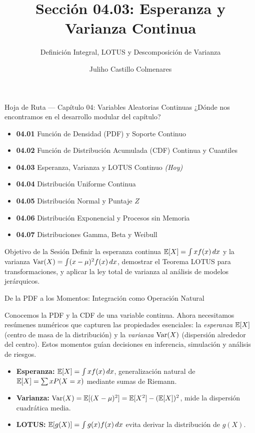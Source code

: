 \documentclass[10pt, aspectratio=169]{beamer}
\title[Esperanza y Varianza Continua]{Sección 04.03: Esperanza y Varianza Continua}
\subtitle{Definición Integral, LOTUS y Descomposición de Varianza}
\author[J. Castillo Colmenares]{Juliho Castillo Colmenares}
\institute{Tecnológico de Monterrey}
\date{\vspace{-1.2cm}}
\begin{document}
\begin{frame}[plain]
  \vspace{-0.8cm}
  \titlepage
\end{frame}

\begin{frame}{Hoja de Ruta --- Capítulo 04: Variables Aleatorias Continuas}
  \footnotesize
  ¿Dónde nos encontramos en el desarrollo modular del capítulo? \pause
  \begin{itemize}\itemsep=0.08em
    \item \textbf{04.01} Función de Densidad (PDF) y Soporte Continuo \pause
    \item \textbf{04.02} Función de Distribución Acumulada (CDF) Continua y Cuantiles \pause
    \item \textbf{04.03} Esperanza, Varianza y LOTUS Continuo \emph{(Hoy)} \pause
    \item \textbf{04.04} Distribución Uniforme Continua \pause
    \item \textbf{04.05} Distribución Normal y Puntaje $Z$ \pause
    \item \textbf{04.06} Distribución Exponencial y Procesos sin Memoria \pause
    \item \textbf{04.07} Distribuciones Gamma, Beta y Weibull
  \end{itemize}
  \vspace{-0.05cm}
  \begin{block}{Objetivo de la Sesión}
    Definir la esperanza continua $\mathbb{E}[X] = \int x f(x)\,dx$ y la varianza $\operatorname{Var}(X) = \int (x-\mu)^{2} f(x)\,dx$, demostrar el Teorema LOTUS para transformaciones, y aplicar la ley total de varianza al análisis de modelos jerárquicos.
  \end{block}
\end{frame}

\begin{frame}{De la PDF a los Momentos: Integración como Operación Natural}
  \footnotesize
  \begin{motivacion}
    Conocemos la PDF y la CDF de una variable continua. Ahora necesitamos resúmenes numéricos que capturen las propiedades esenciales: la \emph{esperanza} $\mathbb{E}[X]$ (centro de masa de la distribución) y la \emph{varianza} $\operatorname{Var}(X)$ (dispersión alrededor del centro). Estos momentos guían decisiones en inferencia, simulación y análisis de riesgos.
  \end{motivacion}

  \vspace{0.15cm}
  \pause
  \begin{itemize}\itemsep=0.1cm
    \item \textbf{Esperanza:} $\mathbb{E}[X] = \int x f(x)\,dx$, generalización natural de $\mathbb{E}[X] = \sum x P(X=x)$ mediante sumas de Riemann. \pause
    \item \textbf{Varianza:} $\operatorname{Var}(X) = \mathbb{E}[(X - \mu)^{2}] = \mathbb{E}[X^{2}] - (\mathbb{E}[X])^{2}$, mide la dispersión cuadrática media. \pause
    \item \textbf{LOTUS:} $\mathbb{E}[g(X)] = \int g(x) f(x)\,dx$ evita derivar la distribución de $g(X)$.
  \end{itemize}
\end{frame}
\end{document}

